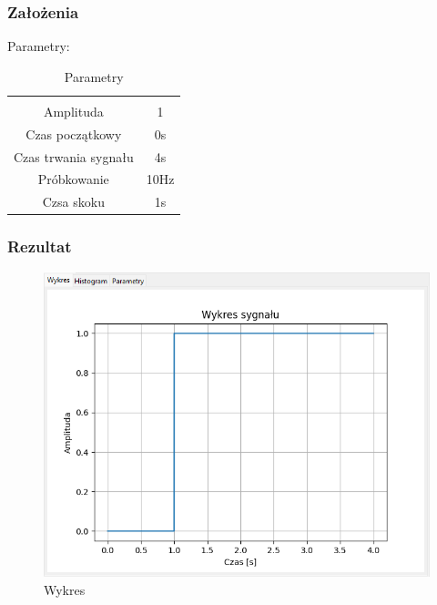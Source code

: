 \documentclass{article}
\begin{document}
\subsubsection{Założenia}
\noindent
Parametry:
\begin{table}[h!]
    \centering
    \vspace{0.2cm}
    \begin{tabular}{|c|c|}
        \hline\hline\\[-0.4cm]
        Amplituda & 1  \\
        \hline
        Czas początkowy & 0s  \\
        \hline
        Czas trwania sygnału & 4s  \\
        \hline
        Próbkowanie & 10Hz \\
        \hline
        Czsa skoku & 1s\\
        \hline
    \end{tabular}
    \caption{Parametry}
    \label{impuls}
\end{table}
\subsubsection{Rezultat}
\begin{figure}[h!]
    \centering
    \includegraphics[width=\textwidth]{img/skok/wykres.png}
    \caption{Wykres}
\end{figure}
\end{document}
